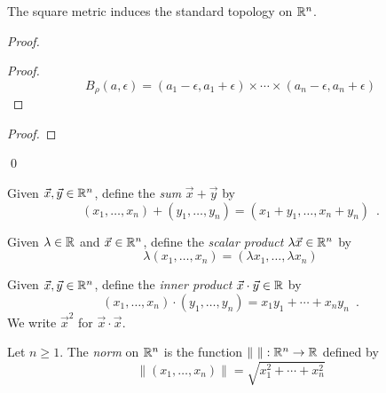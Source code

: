\begin{proposition}
    The square metric induces the standard topology on $\mathbb{R}^n$.
\end{proposition}

\begin{proof}
    \pf
    \begin{proof}
        \pf
        \[ B_\rho(a, \epsilon) = (a_1 - \epsilon, a_1 + \epsilon) \times \cdots \times (a_n - \epsilon, a_n + \epsilon) \]
    \end{proof}
    \begin{proof}
    \end{proof}
    \qed
\end{proof}

\begin{definition}
    Given $\vec{x}, \vec{y} \in \mathbb{R}^n$, define the \emph{sum} $\vec{x} + \vec{y}$ by
    \[ (x_1, \ldots, x_n) + (y_1, \ldots, y_n) = (x_1 + y_1, \ldots, x_n + y_n) \enspace . \]
\end{definition}

\begin{definition}
    Given $\lambda \in \mathbb{R}$ and $\vec{x} \in \mathbb{R}^n$, define the \emph{scalar product} $\lambda \vec{x} \in \mathbb{R}^n$ by
    \[ \lambda (x_1, \ldots, x_n) = (\lambda x_1, \ldots, \lambda x_n) \]
\end{definition}

\begin{definition}
    Given $\vec{x}, \vec{y} \in \mathbb{R}^n$, define the \emph{inner product} $\vec{x} \cdot \vec{y} \in \mathbb{R}$ by
    \[ (x_1, \ldots, x_n) \cdot (y_1, \ldots, y_n) = x_1 y_1 + \cdots + x_n y_n \enspace . \]
    We write $\vec{x}^2$ for $\vec{x} \cdot \vec{x}$.
\end{definition}

\begin{definition}[Norm]
    Let $n \geq 1$. The \emph{norm} on $\mathbb{R}^n$ is the function $\| \ \| : \mathbb{R}^n \rightarrow \mathbb{R}$ defined by
    \[ \| (x_1, \ldots, x_n) \| = \sqrt{x_1^2 + \cdots + x_n^2} \]
\end{definition}

